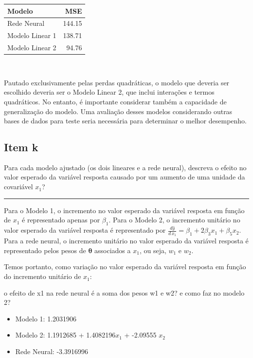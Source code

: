\documentclass[
  a4paperpaper,
]{article}
\providecommand{\tightlist}{%
  \setlength{\itemsep}{0pt}\setlength{\parskip}{0pt}}\usepackage{longtable,booktabs,array}
\begin{document}
\begin{longtable}[]{@{}lr@{}}
\toprule\noalign{}
Modelo & MSE \\
\midrule\noalign{}
\endhead
\bottomrule\noalign{}
\endlastfoot
Rede Neural & 144.15 \\
Modelo Linear 1 & 138.71 \\
Modelo Linear 2 & 94.76 \\
\end{longtable}

~

Pautado exclusivamente pelas perdas quadráticas, o modelo que deveria
ser escolhido deveria ser o Modelo Linear 2, que inclui interações e
termos quadráticos. No entanto, é importante considerar também a
capacidade de generalização do modelo. Uma avaliação desses modelos
considerando outras bases de dados para teste seria necessária para
determinar o melhor desempenho.

\subsection{Item k}\label{item-k}

Para cada modelo ajustado (os dois lineares e a rede neural), descreva o
efeito no valor esperado da variável resposta causado por um aumento de
uma unidade da covariável \(x_1\)?

\begin{center}\rule{0.5\linewidth}{0.5pt}\end{center}

Para o Modelo 1, o incremento no valor esperado da variável resposta em
função de \(x_1\) é representado apenas por \(\beta_1\). Para o Modelo
2, o incremento unitário no valor esperado da variável resposta é
representado por
\(\frac{d \hat{y}}{d \, x_1} = \beta_1 + 2\beta_3x_1 + \beta_5x_2\).
Para a rede neural, o incremento unitário no valor esperado da variável
resposta é representado pelos pesos de \(\boldsymbol{\theta}\)
associados a \(x_1\), ou seja, \(w_1\) e \(w_2\).

Temos portanto, como variação no valor esperado da variável resposta em
função do incremento unitário de \(x_1\):

o efeito de x1 na rede neural é a soma dos pesos w1 e w2? e como faz no
modelo 2?

\begin{itemize}
\tightlist
\item
  Modelo 1: 1.2031906
\item
  Modelo 2: 1.1912685 + 1.4082196\(x_1\) + -2.09555 \(x_2\)
\item
  Rede Neural: -3.3916996
\end{itemize}
\end{document}
